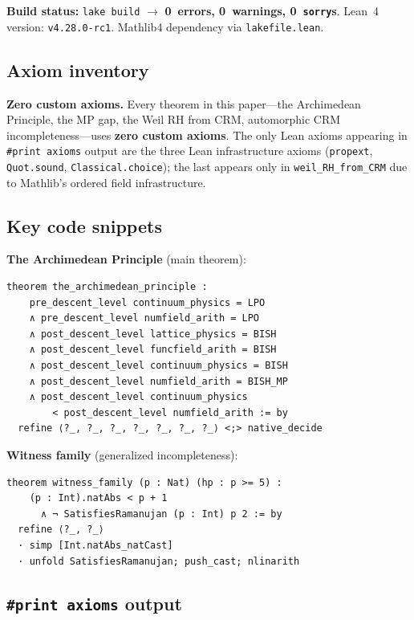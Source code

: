 \documentclass[11pt]{article}
\theoremstyle{definition}
\theoremstyle{remark}
\begin{document}
\medskip\noindent
\textbf{Build status:} \texttt{lake build} $\to$ \textbf{0~errors, 0~warnings, 0~\texttt{sorry}s}. Lean~4 version: \texttt{v4.28.0-rc1}. Mathlib4 dependency via \texttt{lakefile.lean}.

\subsection{Axiom inventory}

\noindent
\textbf{Zero custom axioms.} Every theorem in this paper---the Archimedean Principle, the MP gap, the Weil RH from CRM, automorphic CRM incompleteness---uses \textbf{zero custom axioms}. The only Lean axioms appearing in \texttt{\#print axioms} output are the three Lean infrastructure axioms (\texttt{propext}, \texttt{Quot.sound}, \texttt{Classical.choice}); the last appears only in \texttt{weil\_RH\_from\_CRM} due to Mathlib's ordered field infrastructure.

\subsection{Key code snippets}

\textbf{The Archimedean Principle} (main theorem):

\begin{lstlisting}
theorem the_archimedean_principle :
    pre_descent_level continuum_physics = LPO
    ∧ pre_descent_level numfield_arith = LPO
    ∧ post_descent_level lattice_physics = BISH
    ∧ post_descent_level funcfield_arith = BISH
    ∧ post_descent_level continuum_physics = BISH
    ∧ post_descent_level numfield_arith = BISH_MP
    ∧ post_descent_level continuum_physics
        < post_descent_level numfield_arith := by
  refine ⟨?_, ?_, ?_, ?_, ?_, ?_, ?_⟩ <;> native_decide
\end{lstlisting}

\textbf{Witness family} (generalized incompleteness):

\begin{lstlisting}
theorem witness_family (p : Nat) (hp : p >= 5) :
    (p : Int).natAbs < p + 1
      ∧ ¬ SatisfiesRamanujan (p : Int) p 2 := by
  refine ⟨?_, ?_⟩
  · simp [Int.natAbs_natCast]
  · unfold SatisfiesRamanujan; push_cast; nlinarith
\end{lstlisting}

\subsection{\texttt{\#print axioms} output}
\end{document}
